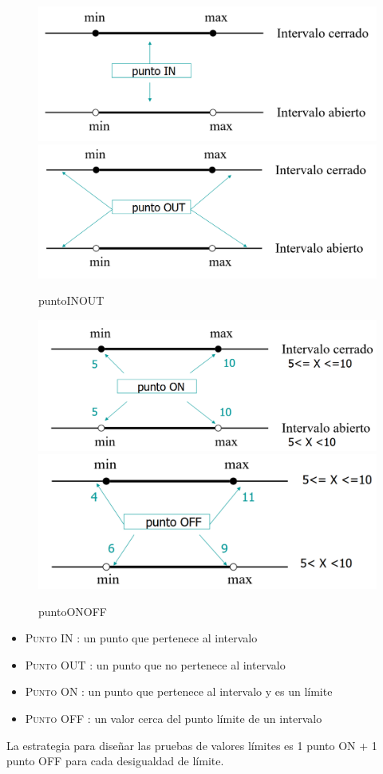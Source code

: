 \begin{figure}[htbp]
   \centering
   \includegraphics[width=0.45\columnwidth]{images/05/puntoIN.png}
   \includegraphics[width=0.45\columnwidth]{images/05/puntoOUT.png}
   \caption{puntoINOUT}
   \label{fig:05/puntoINOUT}
\end{figure}
\begin{figure}[htbp]
   \centering
   \includegraphics[width=0.45\columnwidth]{images/05/puntoON.png}
   \includegraphics[width=0.45\columnwidth]{images/05/puntoOFF.png}
   \caption{puntoONOFF}
   \label{fig:05/puntoONOFF}
\end{figure}

\begin{itemize}
   \item \textsc{Punto IN} : un punto que pertenece al intervalo
   \item \textsc{Punto OUT} : un punto que no pertenece al intervalo
   \item \textsc{Punto ON} : un punto que pertenece al intervalo y es un límite
   \item \textsc{Punto OFF} : un valor cerca del punto límite de un intervalo
\end{itemize}

La estrategia para diseñar las pruebas de valores límites es 1 punto ON + 1 punto OFF para cada desigualdad de límite.

